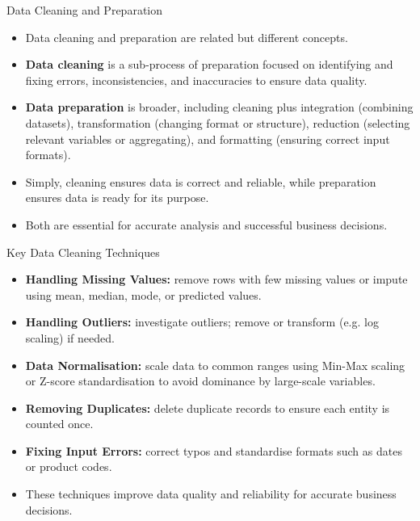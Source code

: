 \documentclass[aspectratio=169, table]{beamer}
\begin{document}
\begin{frame}{Data Cleaning and Preparation}
	\vspace{20pt}
	
	\begin{itemize}
		\item Data cleaning and preparation are related but different concepts.
		
		\item \textbf{Data cleaning} is a sub-process of preparation focused on identifying and fixing errors, inconsistencies, and inaccuracies to ensure data quality.
		
		\item \textbf{Data preparation} is broader, including cleaning plus integration (combining datasets), transformation (changing format or structure), reduction (selecting relevant variables or aggregating), and formatting (ensuring correct input formats).
		
		\item Simply, cleaning ensures data is correct and reliable, while preparation ensures data is ready for its purpose.
		
		\item Both are essential for accurate analysis and successful business decisions.
	\end{itemize}
	
\end{frame}

\begin{frame}{Key Data Cleaning Techniques}
	\vspace{20pt}
	
	\begin{itemize}
		\item \textbf{Handling Missing Values:} remove rows with few missing values or impute using mean, median, mode, or predicted values.
		
		\item \textbf{Handling Outliers:} investigate outliers; remove or transform (e.g. log scaling) if needed.
		
		\item \textbf{Data Normalisation:} scale data to common ranges using Min-Max scaling or Z-score standardisation to avoid dominance by large-scale variables.
		
		\item \textbf{Removing Duplicates:} delete duplicate records to ensure each entity is counted once.
		
		\item \textbf{Fixing Input Errors:} correct typos and standardise formats such as dates or product codes.
		
		\item These techniques improve data quality and reliability for accurate business decisions.
	\end{itemize}
	
\end{frame}
\end{document}
